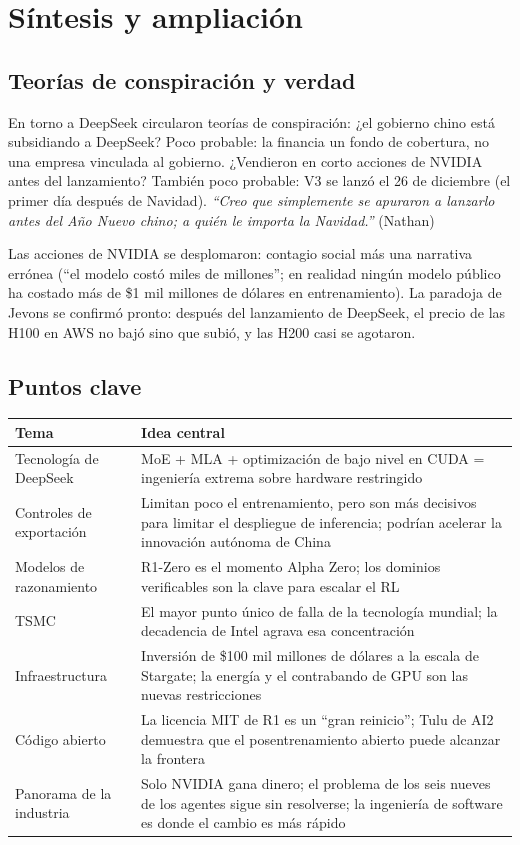\section{Síntesis y ampliación}

\subsection{Teorías de conspiración y verdad}

En torno a DeepSeek circularon teorías de conspiración: ¿el gobierno chino está subsidiando a DeepSeek? Poco probable: la financia un fondo de cobertura, no una empresa vinculada al gobierno. ¿Vendieron en corto acciones de NVIDIA antes del lanzamiento? También poco probable: V3 se lanzó el 26 de diciembre (el primer día después de Navidad). \textit{``Creo que simplemente se apuraron a lanzarlo antes del Año Nuevo chino; a quién le importa la Navidad.''} (Nathan)

Las acciones de NVIDIA se desplomaron: contagio social más una narrativa errónea (``el modelo costó miles de millones''; en realidad ningún modelo público ha costado más de \$1 mil millones de dólares en entrenamiento). La paradoja de Jevons se confirmó pronto: después del lanzamiento de DeepSeek, el precio de las H100 en AWS no bajó sino que subió, y las H200 casi se agotaron.

\subsection{Puntos clave}

\begin{table}[H]
\centering
\begin{tabular}{lp{9cm}}
\toprule
\textbf{Tema} & \textbf{Idea central} \\
\midrule
Tecnología de DeepSeek & MoE + MLA + optimización de bajo nivel en CUDA = ingeniería extrema sobre hardware restringido \\
Controles de exportación & Limitan poco el entrenamiento, pero son más decisivos para limitar el despliegue de inferencia; podrían acelerar la innovación autónoma de China \\
Modelos de razonamiento & R1-Zero es el momento Alpha Zero; los dominios verificables son la clave para escalar el RL \\
TSMC & El mayor punto único de falla de la tecnología mundial; la decadencia de Intel agrava esa concentración \\
Infraestructura & Inversión de \$100 mil millones de dólares a la escala de Stargate; la energía y el contrabando de GPU son las nuevas restricciones \\
Código abierto & La licencia MIT de R1 es un ``gran reinicio''; Tulu de AI2 demuestra que el posentrenamiento abierto puede alcanzar la frontera \\
Panorama de la industria & Solo NVIDIA gana dinero; el problema de los seis nueves de los agentes sigue sin resolverse; la ingeniería de software es donde el cambio es más rápido \\
\bottomrule
\end{tabular}
\end{table}

